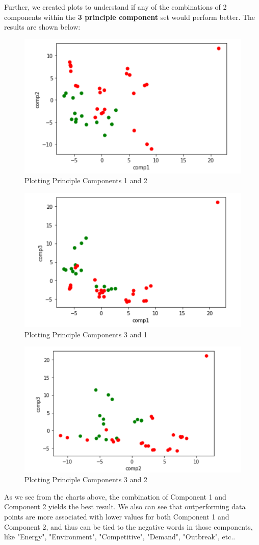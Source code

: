 \documentclass{article}
\begin{document}
Further, we created plots to understand if any of the combinations of 2 components within the \textbf{3 principle component} set would perform better. The results are shown below:

\begin{figure}[ht]
    \centering
    \includegraphics[width = 0.6\linewidth]{Capture 1.PNG}
    \caption{Plotting Principle Components 1 and 2}
    \label{fig:Capture 1}
\end{figure}
\begin{figure}[ht]
    \centering
    \includegraphics[width = 0.6\linewidth]{Capture 2.PNG}
    \caption{Plotting Principle Components 3 and 1}
    \label{fig:Capture 2}
\end{figure}
\begin{figure}[ht]
    \centering
    \includegraphics[width = 0.6\linewidth]{Capture 3.PNG}
    \caption{Plotting Principle Components 3 and 2}
    \label{fig:Capture 3}
\end{figure}


As we see from the charts above, the combination of Component 1 and Component 2 yields the best result. We also can see that outperforming data points are more associated with lower values for both Component 1 and Component 2, and thus can be tied to the negative words in those components, like "Energy", "Environment", "Competitive", "Demand", "Outbreak", etc.. 
\end{document}
